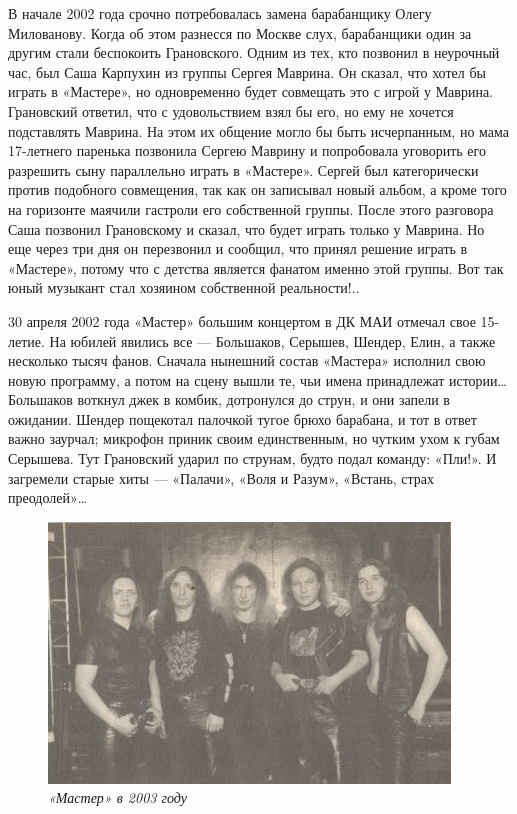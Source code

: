 \documentclass[16pt,a5paper,oneside]{book}
\begin{document}
В начале 2002 года срочно потребовалась замена барабанщику Олегу Милованову. Когда об этом разнесся по Москве слух,
барабанщики один за другим стали беспокоить Грановского. Одним из тех, кто позвонил в неурочный час, был Саша Карпухин
из группы Сергея Маврина. Он сказал, что хотел бы играть в «Мастере», но одновременно будет совмещать это с игрой у
Маврина. Грановский ответил, что с удовольствием взял бы его, но ему не хочется подставлять Маврина. На этом их общение
могло бы быть исчерпанным, но мама 17-летнего паренька позвонила Сергею Маврину и попробовала уговорить его разрешить
сыну параллельно играть в «Мастере». Сергей был категорически против подобного совмещения, так как он записывал новый
альбом, а кроме того на горизонте маячили гастроли его собственной группы. После этого разговора Саша позвонил
Грановскому и сказал, что будет играть только у Маврина. Но еще через три дня он перезвонил и сообщил, что принял
решение играть в «Мастере», потому что с детства является фанатом именно этой группы. Вот так юный музыкант стал
хозяином собственной реальности!..

30 апреля 2002 года «Мастер» большим концертом в ДК МАИ отмечал свое 15-летие. На юбилей явились все — Большаков,
Серышев, Шендер, Елин, а также несколько тысяч фанов. Сначала нынешний состав «Мастера» исполнил свою новую программу, а
потом на сцену вышли те, чьи имена принадлежат истории\ldots Большаков воткнул джек в комбик, дотронулся до струн, и они
запели в ожидании. Шендер пощекотал палочкой тугое брюхо барабана, и тот в ответ важно заурчал; микрофон приник своим
единственным, но чутким ухом к губам Серышева. Тут Грановский ударил по струнам, будто подал команду: «Пли!». И
загремели старые хиты — «Палачи», «Воля и Разум», «Встань, страх преодолей»\ldots

\begin{figure}
    \centering
    \includegraphics[scale=0.9]{Image36}
    \caption{\textit{«Мастер» в 2003 году}}
\end{figure}
\end{document}

